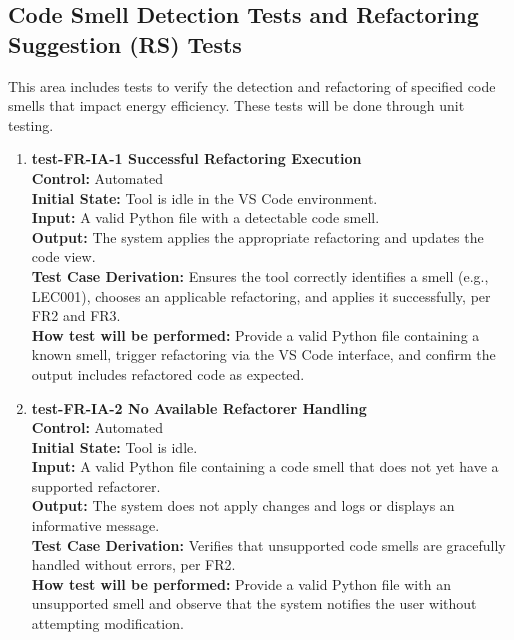 \documentclass[12pt, titlepage]{article}
\begin{document}
\subsection{Code Smell Detection Tests and Refactoring Suggestion (RS) Tests}

This area includes tests to verify the detection and refactoring of specified code smells that impact energy efficiency. These tests will be done through unit testing.

\begin{enumerate}
  \item \textbf{test-FR-IA-1 Successful Refactoring Execution} \\[2mm]
    \textbf{Control:} Automated \\
    \textbf{Initial State:} Tool is idle in the VS Code environment. \\
    \textbf{Input:} A valid Python file with a detectable code smell. \\
    \textbf{Output:} The system applies the appropriate refactoring and updates the code view. \\
    \textbf{Test Case Derivation:} Ensures the tool correctly identifies a smell (e.g., LEC001), chooses an applicable refactoring, and applies it successfully, per FR2 and FR3. \\
    \textbf{How test will be performed:} Provide a valid Python file containing a known smell, trigger refactoring via the VS Code interface, and confirm the output includes refactored code as expected.

  \item \textbf{test-FR-IA-2 No Available Refactorer Handling} \\[2mm]
    \textbf{Control:} Automated \\
    \textbf{Initial State:} Tool is idle. \\
    \textbf{Input:} A valid Python file containing a code smell that does not yet have a supported refactorer. \\
    \textbf{Output:} The system does not apply changes and logs or displays an informative message. \\
    \textbf{Test Case Derivation:} Verifies that unsupported code smells are gracefully handled without errors, per FR2. \\
    \textbf{How test will be performed:} Provide a valid Python file with an unsupported smell and observe that the system notifies the user without attempting modification.


\end{enumerate}
\end{document}
